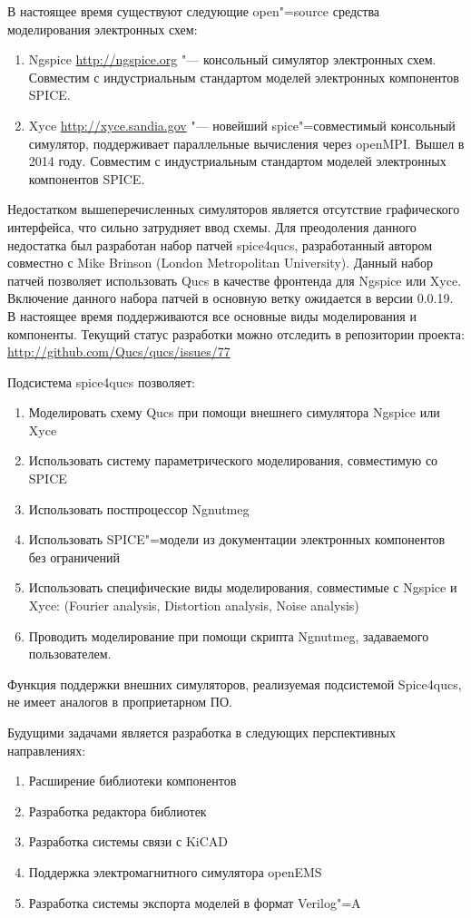 \documentclass[10pt, a5paper]{article}
\begin{document}
В настоящее время существуют следующие open"=source средства моделирования 
электронных схем:
\begin{enumerate}
\item Ngspice \url{http://ngspice.org} "--- консольный симулятор элект\-ронных схем. 
Совместим с индустриальным стандартом моделей электронных компонентов SPICE.
\item Xyce \url{http://xyce.sandia.gov} "--- новейший spice"=совместимый консольный 
симулятор, поддерживает параллельные вычисления через openMPI. Вышел в 2014 
году. Совместим с индустриальным стандартом моделей электронных компонентов 
SPICE.
\end{enumerate}

Недостатком вышеперечисленных симуляторов является отсутствие графического 
интерфейса, что сильно затрудняет ввод схемы. Для преодоления данного 
недостатка был разработан набор патчей spice4qucs, разработанный автором 
совместно с Mike Brinson (London Metropolitan University). Данный набор патчей позволяет использовать Qucs в качестве фронтенда для Ngspice или Xyce. Включение данного набора патчей в основную ветку ожидается в версии 0.0.19. В настоящее время поддерживаются все основные виды моделирования и компоненты. Текущий статус разработки можно отследить в репозитории проекта: \url{http://github.com/Qucs/qucs/issues/77}

Подсистема spice4qucs позволяет:
\begin{enumerate}
\item Моделировать схему Qucs при помощи внешнего симулятора Ngspice или Xyce
\item Использовать систему параметрического моделирования, совместимую со SPICE
\item Использовать постпроцессор Ngnutmeg
\item Использовать SPICE"=модели из документации электронных компонентов без 
ограничений
\item Использовать специфические виды моделирования, совместимые с Ngspice и 
Xyce: (Fourier analysis, Distortion analysis, Noise analysis)
\item Проводить моделирование при помощи скрипта Ngnutmeg, задаваемого 
пользователем.
\end{enumerate}

Функция поддержки внешних симуляторов, реализуемая подсистемой Spice4qucs, не 
имеет аналогов в проприетарном ПО.

Будущими задачами является разработка в следующих перспективных направлениях:
\begin{enumerate}
\item Расширение библиотеки компонентов
\item Разработка редактора библиотек
\item Разработка системы связи с KiCAD
\item Поддержка электромагнитного симулятора openEMS
\item Разработка системы экспорта моделей в формат Verilog"=A
\end{enumerate}
\end{document}

